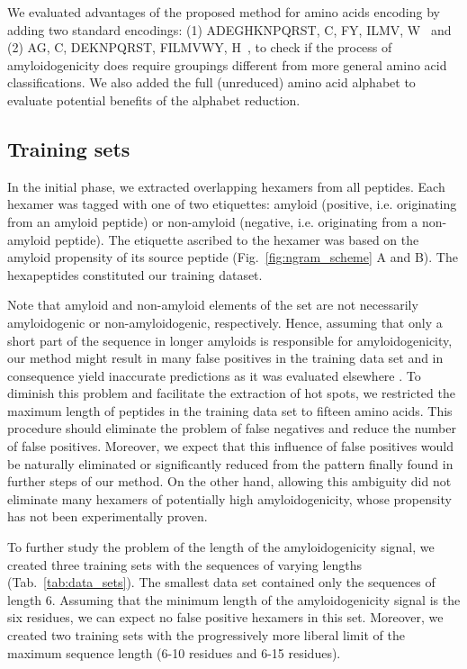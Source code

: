 \documentclass[fleqn,10pt,twoside]{gcb15submission}
\begin{document}
  We evaluated advantages of the proposed method for amino acids encoding by 
adding two standard encodings: (1) ADEGHKNPQRST, C, FY, ILMV, W~\citep{kosiol_new_2004} 
and (2) AG, C, DEKNPQRST, FILMVWY, H~\citep{melo_accuracy_2006}, to check if the process 
of amyloidogenicity does require groupings different from more general 
amino acid classifications. We also added the full (unreduced) amino acid 
alphabet to evaluate potential benefits of the alphabet reduction.

\subsection{Training sets}

In the initial phase, we extracted overlapping hexamers from all peptides. Each 
hexamer was tagged with one of two etiquettes: amyloid (positive, i.e. 
originating from an amyloid peptide) or non-amyloid (negative, i.e. originating 
from a non-amyloid peptide). The etiquette ascribed to the hexamer was based on 
the amyloid propensity of its source peptide (Fig.~\ref{fig:ngram_scheme} A and 
B). The hexapeptides constituted our training dataset. 

  Note that amyloid and non-amyloid elements of the set are not necessarily 
amyloidogenic or non-amyloidogenic, respectively. Hence, assuming that only a 
short part of the sequence in longer amyloids is responsible for 
amyloidogenicity, our method might result in many false positives in the 
training data set and in consequence yield inaccurate predictions as it was 
evaluated elsewhere \citep{kotulska_amyloid_2013}. To diminish this problem and 
facilitate the extraction of hot spots, we restricted the maximum length of 
peptides in the training data set to fifteen amino acids. This procedure should 
eliminate the problem of false negatives and reduce the number of false 
positives. Moreover, we expect that this  influence of false positives  would be 
naturally eliminated or significantly reduced from the pattern finally found in 
further steps of our method. On the other hand, allowing this ambiguity did not eliminate 
many hexamers of potentially high amyloidogenicity, whose propensity has not 
been experimentally proven. 

  To further study the problem of the length of the amyloidogenicity signal, 
we created three training sets with the sequences of varying lengths 
(Tab.~\ref{tab:data_sets}). The smallest data set contained only the sequences 
of length 6. Assuming that the minimum length of the amyloidogenicity signal is 
the six residues, we can expect no false positive hexamers in this set. 
Moreover, we created two training sets with the progressively more liberal limit 
of the maximum sequence length (6-10 residues and 6-15 residues).
\end{document}
